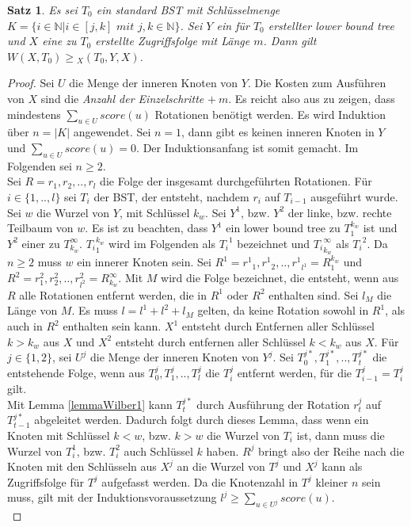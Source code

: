 \documentclass[a4paper,12pt]{article}
\newtheorem{Satz}{Satz}[section]
\begin{document}
\begin{Satz} \label{satzWilber1} Es sei $T_0$ ein standard BST mit Schlüsselmenge\\ ${K = \{  i \in \mathbb{N} \vert i \in \left[j,k\right] \textit{ mit } j,k \in  \mathbb{N} \}} $. Sei $Y$ ein für $T_0$ erstellter lower bound tree und $X$ eine zu $T_0$ erstellte Zugriffsfolge mit Länge $m$. Dann gilt\\  $W\left(X, T_0\right) \geq {_X(T_0, Y, X)} $.  
\end{Satz}
\begin{proof}
	Sei $U$ die Menge der inneren Knoten von $Y$. Die Kosten zum Ausführen von $X$ sind die \textit{Anzahl der Einzelschritte} $ +~m$. Es reicht also aus zu zeigen, dass mindestens $\sum_{u \in U} {\mathit{score}} \left(u\right)$ Rotationen benötigt werden. Es wird Induktion über  $n = \vert K \vert$ angewendet. Sei $n = 1$, dann gibt es keinen inneren Knoten in $Y$ und $\sum_{u \in U} {\mathit{score}} \left(u\right) = 0$. Der Induktionsanfang ist somit gemacht. Im Folgenden sei $n \geq 2$.\\
	Sei $R = r_1,r_2,..,r_l$ die Folge der insgesamt durchgeführten Rotationen. Für $i \in \{1,..,l\}$ sei $T_i$ der BST, der entsteht, nachdem $r_i$ auf $T_{i-1}$ ausgeführt wurde. Sei $w$ die Wurzel von $Y$, mit Schlüssel $k_w$. Sei $Y^1$, bzw. $Y^2$ der linke, bzw. rechte Teilbaum von $w$. Es ist zu beachten, dass $Y^1$ ein lower bound tree zu $T_{1}^{k_w}$ ist und  $Y^2$ einer zu $T^\infty_{k_w}$. ${T_{i}}_1^{k_w}$ wird im Folgenden als ${T_i}^1$ bezeichnet und ${T_{i}}_{k_w}^{\infty}$ als ${T_i}^2$. Da $n \geq 2$ muss $w$ ein innerer Knoten sein. Sei  $R^1 = {r^1}_1,{r^1}_2,..,{r^1}_{l^1} = R^{k_w}_1$ und $R^2 = r^2_1,r^2_2,..,r^2_{l^2} = R^\infty_{k_w}$. Mit $M$ wird die Folge bezeichnet, die entsteht, wenn aus $R$ alle Rotationen entfernt werden, die in $R^1$ oder $R^2$ enthalten sind. Sei $l_M$ die Länge von $M$. Es muss $l = l^1 + l^2 + l_M$ gelten, da keine Rotation sowohl in $R^1$, als auch in $R^2$ enthalten sein kann. $X^1$ entsteht durch Entfernen aller Schlüssel $k > k_w$ aus $X$ und  $X^2$ entsteht durch entfernen aller Schlüssel $k < k_w$ aus $X$. Für $j \in \{1,2\}$, sei $U^j$ die Menge der inneren Knoten von $Y^j$. Sei $T^{j*}_0,T^{j*}_1,..,T^{j*}_{t}$ die entstehende Folge, wenn aus $T^{j}_0,T^{j}_1,..,T^{j}_{l}$ die $T^j_i$ entfernt werden, für die $T^j_{i-1} = T^j_i$ gilt.\\ Mit Lemma \ref{lemmaWilber1} kann  $T^{j*}_{t}$ durch Ausführung der Rotation $r^j_t$ auf $T^{j*}_{t-1}$ abgeleitet werden. Dadurch folgt durch dieses Lemma, dass wenn ein Knoten mit Schlüssel $k < w$, bzw. $k > w$ die Wurzel von $T_i$ ist, dann muss die Wurzel von $T^1_i$, bzw. $T^2_i$ auch Schlüssel $k$ haben. $R^j$ bringt also der Reihe nach die Knoten mit den Schlüsseln aus $X^j$ an die Wurzel von $T^j$ und  $X^j$ kann als Zugriffsfolge für $T^j$ aufgefasst werden. Da die Knotenzahl in $T^j$ kleiner $n$ sein muss, gilt mit der Induktionsvoraussetzung  $l^j \geq \sum_{u \in U^j} {\mathit{score}} (u)$.\\

\end{proof}
\end{document}

